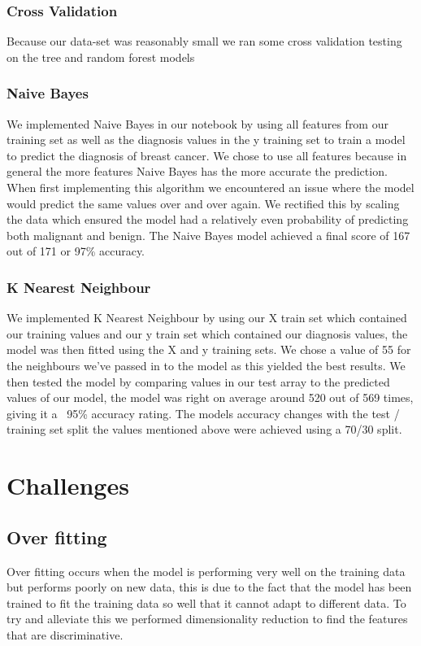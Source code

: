 \documentclass[conference]{IEEEtran}
\begin{document}
\subsubsection{Cross Validation} Because our data-set was reasonably small we ran some cross validation testing on the tree and random forest models 
\subsubsection{Naive Bayes}
We implemented Naive Bayes in our notebook by using all features from our training set as well as the diagnosis values in the y training set to train a model to predict the diagnosis of breast cancer.  We chose to use all features because in general the more features Naive Bayes has the more accurate the prediction.  When first implementing this algorithm we encountered an issue where the model would predict the same values over and over again.  We rectified this by scaling the data which ensured the model had a relatively even probability of predicting both malignant and benign.  The Naive Bayes model achieved a final score of 167 out of 171 or 97\% accuracy.
\subsubsection{K Nearest Neighbour}
We implemented K Nearest Neighbour by using our X train set which contained our training values and our y train set which contained our diagnosis values, the model was then fitted using the X and y training sets.  We chose a value of 55 for the neighbours we've passed in to the model as this yielded the best results.  We then tested the model by comparing values in our test array to the predicted values of our model, the model was right on average around 520 out of 569 times, giving it a ~95\% accuracy rating. The models accuracy changes with the test / training set split the values mentioned above were achieved using a 70/30 split.
\section{Challenges}
\subsection{Over fitting}
Over fitting occurs when the model is performing very well on the training data but performs poorly on new data, this is due to the fact that the model has been trained to fit the training data so well that it cannot adapt to different data. To try and alleviate this we performed dimensionality reduction to find the features that are discriminative.
\end{document}
